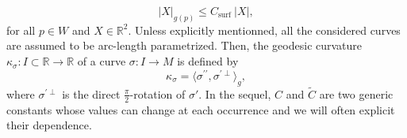 \documentclass{article}
\newcommand{\Csurf}{C_{\text{surf }}}
\newcommand{\R}{\mathbb{R}}
\newcommand{\surf}{M}
\newcommand{\ko}{\kappa}
\theoremstyle{remark}
\theoremstyle{prpart}
\begin{document}
\begin{equation}\label{eq:equiv}
  |X|_{g(p)} \leq \Csurf|X|,
\end{equation}
for all $p\in W$ and $X\in\R^2$. Unless explicitly mentionned, all the considered curves are assumed to be arc-length parametrized. Then, the geodesic curvature $\ko_{\sigma}:I\subset\R\to\R$ of a curve $\sigma:I\to\surf$ is defined by
\begin{equation}\label{eq:geod-dual1}
   \ko_{\sigma} = \langle\sigma^{\prime\prime},\sigma^{\prime\perp}\rangle_g,
\end{equation}
where $\sigma^{\prime\perp}$ is the direct $\frac{\pi}{2}$-rotation of $\sigma'$. In the sequel, $C$ and $\tilde C$ are two generic constants whose values can change at each occurrence and we will often explicit their dependence.
\end{document}
